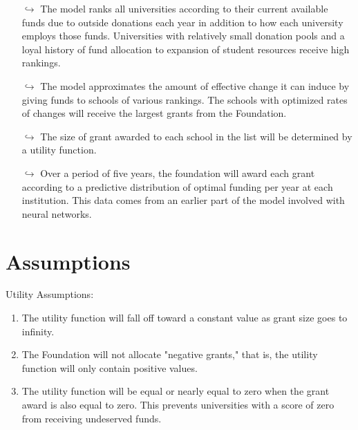\documentclass[paper.tex]{subfiles}
\begin{document}
	\begin{itemize} 
		\item[$\hookrightarrow$] The model ranks all universities according to their current available funds due to outside donations each year in addition to how each university employs those funds. Universities with relatively small donation pools and a loyal history of fund allocation to expansion of student resources receive high rankings.
		\item[$\hookrightarrow$] The model approximates the amount of effective change it can induce by giving funds to schools of various rankings. The schools with optimized rates of changes will receive the largest grants from the Foundation.
		\item[$\hookrightarrow$] The size of grant awarded to each school in the list will be determined by a utility function.
		\item[$\hookrightarrow$] Over a period of five years, the foundation will award each grant according to a predictive distribution of optimal funding per year at each institution. This data comes from an earlier part of the model involved with neural networks.
	\end{itemize}
	
	
	\section{Assumptions}
Utility Assumptions:
	\begin{enumerate}
		\item The utility function will fall off toward a constant value as grant size goes to infinity.
		\item The Foundation will not allocate "negative grants," that is, the utility function will only contain positive values.
		\item The utility function will be equal or nearly equal to zero when the grant award is also equal to zero. This prevents universities with a score of zero from receiving undeserved funds.
	\end{enumerate}
\end{document}
